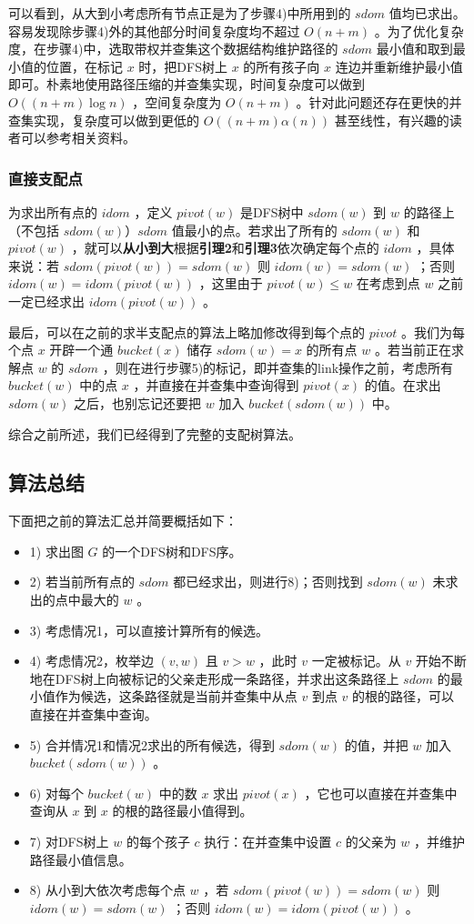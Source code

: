 \documentclass{noithesis}
\begin{document}
可以看到，从大到小考虑所有节点正是为了步骤4)中所用到的 $sdom$ 值均已求出。容易发现除步骤4)外的其他部分时间复杂度均不超过 $O(n+m)$ 。为了优化复杂度，在步骤4)中，选取带权并查集这个数据结构维护路径的 $sdom$ 最小值和取到最小值的位置，在标记 $x$ 时，把DFS树上 $x$ 的所有孩子向 $x$ 连边并重新维护最小值即可。朴素地使用路径压缩的并查集实现，时间复杂度可以做到 $O((n+m)\log n)$ ，空间复杂度为 $O(n+m)$ 。针对此问题还存在更快的并查集实现，复杂度可以做到更低的 $O((n+m)\alpha(n))$ 甚至线性，有兴趣的读者可以参考相关资料。

\subsubsection{直接支配点}

为求出所有点的 $idom$ ，定义 $pivot(w)$ 是DFS树中 $sdom(w)$ 到 $w$ 的路径上（不包括 $sdom(w)$）$sdom$ 值最小的点。若求出了所有的 $sdom(w)$ 和 $pivot(w)$ ，就可以\textbf{从小到大}根据\textbf{引理2}和\textbf{引理3}依次确定每个点的 $idom$ ，具体来说：若 $sdom(pivot(w)) = sdom(w)$ 则 $idom(w) = sdom(w)$ ；否则 $idom(w) = idom(pivot(w))$ ，这里由于 $pivot(w)\le w$ 在考虑到点 $w$ 之前一定已经求出 $idom(pivot(w))$ 。

最后，可以在之前的求半支配点的算法上略加修改得到每个点的 $pivot$ 。我们为每个点 $x$ 开辟一个通 $bucket(x)$ 储存 $sdom(w) = x$ 的所有点 $w$ 。若当前正在求解点 $w$ 的 $sdom$ ，则在进行步骤5)的标记，即并查集的link操作之前，考虑所有 $bucket(w)$ 中的点 $x$ ，并直接在并查集中查询得到 $pivot(x)$ 的值。在求出 $sdom(w)$ 之后，也别忘记还要把 $w$ 加入 $bucket(sdom(w))$ 中。

综合之前所述，我们已经得到了完整的支配树算法。

\subsection{算法总结}

下面把之前的算法汇总并简要概括如下：

\begin{itemize}
	\item 1) 求出图 $G$ 的一个DFS树和DFS序。
	\item 2) 若当前所有点的 $sdom$ 都已经求出，则进行8)；否则找到 $sdom(w)$ 未求出的点中最大的 $w$ 。
	\item 3) 考虑情况1，可以直接计算所有的候选。
	\item 4) 考虑情况2，枚举边 $(v,w)$ 且 $v > w$ ，此时 $v$ 一定被标记。从 $v$ 开始不断地在DFS树上向被标记的父亲走形成一条路径，并求出这条路径上 $sdom$ 的最小值作为候选，这条路径就是当前并查集中从点 $v$ 到点 $v$ 的根的路径，可以直接在并查集中查询。
	\item 5) 合并情况1和情况2求出的所有候选，得到 $sdom(w)$ 的值，并把 $w$ 加入 $bucket(sdom(w))$ 。
	\item 6) 对每个 $bucket(w)$ 中的数 $x$ 求出 $pivot(x)$ ，它也可以直接在并查集中查询从 $x$ 到 $x$ 的根的路径最小值得到。
	\item 7) 对DFS树上 $w$ 的每个孩子 $c$ 执行：在并查集中设置 $c$ 的父亲为 $w$ ，并维护路径最小值信息。
	\item 8) 从小到大依次考虑每个点 $w$ ，若 $sdom(pivot(w)) = sdom(w)$ 则 $idom(w) = sdom(w)$ ；否则 $idom(w) = idom(pivot(w))$ 。
\end{itemize}
\end{document}
